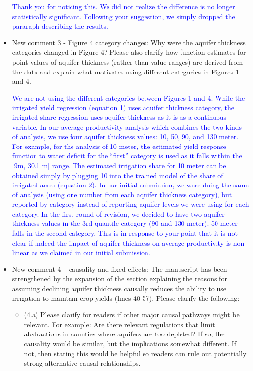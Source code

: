 \documentclass[
]{article}
\begin{document}
\begin{itemize}
    \textcolor{blue}{Thank you for noticing this. We did not realize the difference is no longer statistically significant. Following your suggestion, we simply dropped the pararaph describing the results.}

\item New comment 3 - Figure 4 category changes: Why were the aquifer thickness categories changed in Figure 4? Please also clarify how function estimates for point values of aquifer thickness (rather than value ranges) are derived from the data and explain what motivates using different categories in Figures 1 and 4.

    \textcolor{blue}{We are not using the different categories between Figures 1 and 4. While the irrigated yield regression (equation 1) uses aquifer thickness category, the irrigated share regression uses aquifer thickness as it is as a continuous variable. In our average productivity analysis which combines the two kinds of analysis, we use four aquifer thickness values: 10, 50, 90, and 130 meter. For example, for the analysis of 10 meter, the estimated yield response function to water deficit for the ``first'' category is used as it falls within the [9m, 30.1 m] range. The estimated irrigation share for 10 meter can be obtained simply by plugging 10 into the trained model of the share of irrigated acres (equation 2). In our initial submission, we were doing the same of analysis (using one number from each aquifer thickness category), but reported by category instead of reporting aquifer levels we were using for each category. In the first round of revision, we decided to have two aquifer thickness values in the 3rd quantile category (90 and 130 meter). 50 meter falls in the second category. This is in response to your point that it is not clear if indeed the impact of aquifer thickness on average productivity is non-linear as we claimed in our initial submission.}

\item New comment 4 – causality and fixed effects: The manuscript has been strengthened by the expansion of the section explaining the reasons for assuming declining aquifer thickness causally reduces the ability to use irrigation to maintain crop yields (lines 40-57). Please clarify the following:

  \begin{itemize}
  \item (4.a) Please clarify for readers if other major causal pathways might be relevant. For example: Are there relevant regulations that limit abstractions in counties where aquifers are too depleted? If so, the causality would be similar, but the implications somewhat different. If not, then stating this would be helpful so readers can rule out potentially strong alternative causal relationships.


\end{itemize}
\end{itemize}
\end{document}
